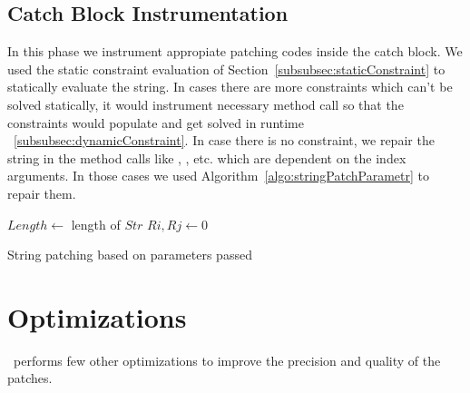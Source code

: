 \subsection{Catch Block Instrumentation}
\label{sub:catchInstrumentation}

In this phase we instrument appropiate patching codes inside the catch block.
We used the static constraint evaluation of
Section~\ref{subsubsec:staticConstraint} to statically evaluate the string. In
cases there are more constraints which can't be solved statically, it would instrument
necessary method call so that the constraints would populate and get solved in runtime
~\ref{subsubsec:dynamicConstraint}. In case there is no constraint, we repair the
string in the method calls like , ,  etc.
which are dependent on the index arguments. In those cases we used
Algorithm~\ref{algo:stringPatchParametr} to repair them.


\begin{algorithm}
\scriptsize
\DontPrintSemicolon
{}
\Begin
{
	$Length \longleftarrow$ length of $Str$\;
	 {
		$Ri, Rj \longleftarrow 0$\;
	} 
}
\caption{String patching based on parameters passed}
\label{algo:stringPatchParametr}
\end{algorithm}

\section{Optimizations}
\label{sec:optimizations}

\tool\ performs few other optimizations to improve the precision and quality
of the patches.


